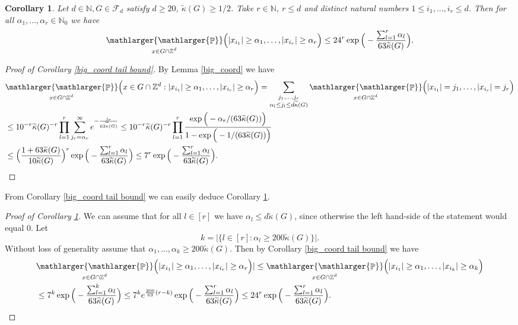 \documentclass[a4paper,oneside, reqno]{amsart}
\numberwithin{equation}{section}
\newtheorem{Cor}[Thm]{Corollary}
\theoremstyle{definition}%
\theoremstyle{definition}
\theoremstyle{definition}%
\theoremstyle{definition}
\newcommand{\Pro}{\mathop{\mathbb{P}}}
\newcommand{\Z}{\mathbb{Z}}
\newcommand{\N}{\mathbb{N}}
\newcommand{\spr}[1]{\underset{_{\substack{#1}}}{\mathlarger{\mathlarger{\Pro}}}}
\begin{document}
\begin{Cor} \label{big_coord tail bound no ass on alpha}
   Let $d \in \N, G \in \mathcal{F}_d$ satisfy $d \ge 20$, $\widetilde{\kappa}(G) \ge 1/2$. Take $r \in \N$, $r \le d$ and distinct natural numbers $1 \le i_1,...,i_r \le d$. Then for all $\alpha_1,...,\alpha_r \in \N_0$  we have
    \[
    \spr{x \in G \cap \Z^d} \Big( |x_{i_1}|\ge \alpha_1, \ldots,|x_{i_r}| \ge \alpha_r \Big) \le 24^r\exp\Big(- \frac{\sum_{l=1}^r\alpha_l}{63\widetilde{\kappa}(G)} \Big) .
    \]  
\end{Cor}
\begin{proof}[Proof of Corollary \ref{big_coord tail bound}]
    By Lemma \ref{big_coord} we have 
    \begin{align*}
        &\spr{x \in G \cap \Z^d} \Big( x \in G \cap \Z^d: |x_{i_1}|\ge \alpha_1, \ldots,|x_{i_r}| \ge \alpha_r \Big)= \sum_{\substack{j_1,\ldots, j_r \\
        \alpha_l \le j_l \le d \widetilde{\kappa}(G)}} \spr{x \in G \cap \Z^d} \Big( |x_{i_1}|=j_1, \ldots,|x_{i_r}|=j_r \Big) \\
        &\le 10^{-r} \widetilde{\kappa}(G)^{-r}\prod_{l=1}^r \sum_{j_r= \alpha_r}^\infty e^{- \frac{j_r}{63 \widetilde{\kappa}(G)}} \le  10^{-r} \widetilde{\kappa}(G)^{-r}\prod_{l=1}^r \frac{\exp\Big(- \alpha_r/(63 \widetilde{\kappa}(G))\Big)}{1-\exp\Big(- 1/(63 \widetilde{\kappa}(G))\Big)}\\
        &\le \Big(\frac{1+63 \widetilde{\kappa}(G)}{10 \widetilde{\kappa}(G)} \Big)^r \exp\Big(- \frac{\sum_{l=1}^r\alpha_l}{63\widetilde{\kappa}(G)} \Big)  \le 7^r \exp\Big(- \frac{\sum_{l=1}^r\alpha_l}{63\widetilde{\kappa}(G)} \Big) .
    \end{align*}
\end{proof}
From Corollary \ref{big_coord tail bound} we can easily deduce Corollary \ref{big_coord tail bound no ass on alpha}.
\begin{proof}[Proof of Corollary \ref{big_coord tail bound no ass on alpha}]
We can assume that for all $l \in [r]$ we have $\alpha_l \le d \widetilde{\kappa}(G)$, since otherwise the left hand-side of the statement would equal $0$. Let 
\[
k= \Big| \Big\{ l \in [r]: \alpha_l \ge 200 \widetilde{\kappa}(G) \Big\}\Big|.
\]
Without loss of generality assume that $\alpha_1,..., \alpha_k \ge 200 \widetilde{\kappa}(G)$. Then by Corollary \ref{big_coord tail bound} we have 
\begin{align*}
    &\spr{x \in G \cap \Z^d} \Big( |x_{i_1}|\ge \alpha_1, \ldots,|x_{i_r}| \ge \alpha_r \Big)| \le \spr{x \in G \cap \Z^d} \Big( |x_{i_1}|\ge \alpha_1, \ldots,|x_{i_k}| \ge \alpha_k \Big) \\
    &\le 7^k \exp\Big(- \frac{\sum_{l=1}^k\alpha_l}{63\widetilde{\kappa}(G)} \Big)  \le 7^k e^{\frac{200}{63}(r-k)} \exp\Big(- \frac{\sum_{l=1}^r\alpha_l}{63\widetilde{\kappa}(G)} \Big)  \le 24^r \exp\Big(- \frac{\sum_{l=1}^r\alpha_l}{63\widetilde{\kappa}(G)} \Big).
\end{align*}
\end{proof}
\end{document}
